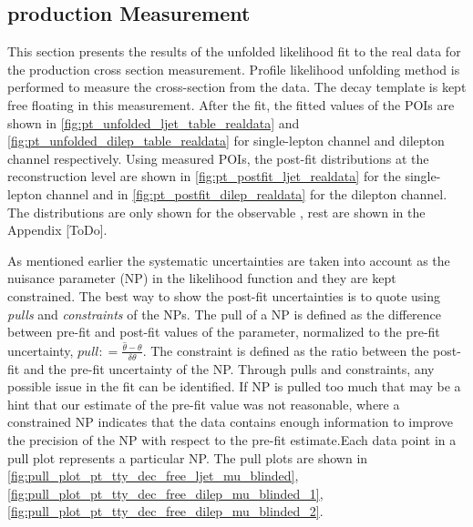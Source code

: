 \subsection{\tty production Measurement}
\label{sec:tty_prod_measurement}

This section presents the results of the unfolded likelihood fit to the real data for the \tty production cross section measurement. Profile likelihood unfolding method is performed to measure the cross-section from the data. The \tty decay template is kept free floating in this measurement.
After the fit, the fitted values of the POIs are shown in \cref{fig:pt_unfolded_ljet_table_realdata} and \cref{fig:pt_unfolded_dilep_table_realdata} for single-lepton channel and dilepton channel respectively. Using measured POIs, the post-fit distributions at the reconstruction level are shown in \cref{fig:pt_postfit_ljet_realdata} for the single-lepton channel and in \cref{fig:pt_postfit_dilep_realdata} for the dilepton channel. The distributions are only shown for the observable \ptgamma, rest are shown in the Appendix [ToDo].

As mentioned earlier the systematic uncertainties are taken into account as the nuisance parameter (NP) in the likelihood function and they are kept constrained. The best way to show the post-fit uncertainties is to quote using \textit{pulls} and \textit{constraints} of the NPs. The pull of a NP is defined as the difference between pre-fit and post-fit values of the parameter, normalized to the pre-fit uncertainty, $pull: = \frac{\hat{\theta}- \theta}{\delta \theta}$. The constraint is defined as the ratio between the post-fit and the pre-fit uncertainty of the NP. Through pulls and constraints, any possible issue in the fit can be identified. If NP is pulled too much that may be a hint that our estimate of the pre-fit value was not reasonable, where a constrained NP indicates that the data contains enough information to improve the precision of the NP with respect to the pre-fit estimate.Each data point in a pull plot represents a particular NP. The pull plots are shown in \cref{fig:pull_plot_pt_tty_dec_free_ljet_mu_blinded}, \cref{fig:pull_plot_pt_tty_dec_free_dilep_mu_blinded_1}, \cref{fig:pull_plot_pt_tty_dec_free_dilep_mu_blinded_2}. %

